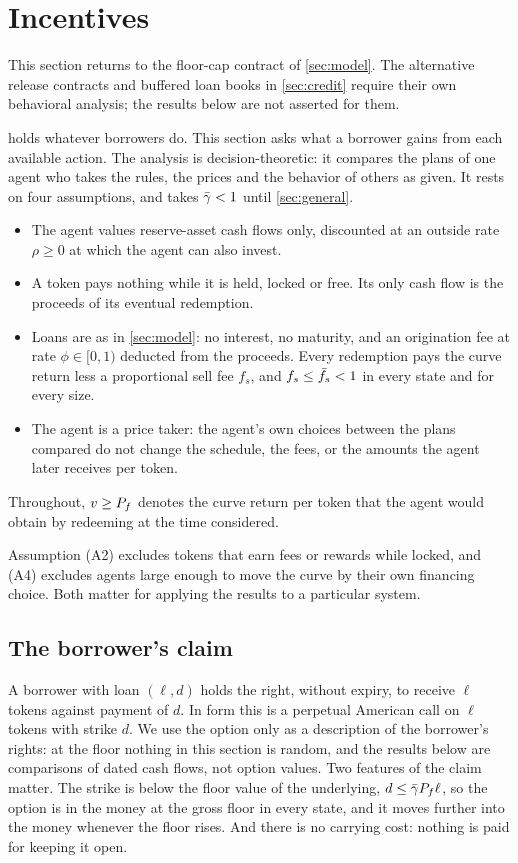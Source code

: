 \section{Incentives}\label{sec:incentives}

This section returns to the floor-cap contract of \cref{sec:model}. The alternative release contracts and buffered loan books in \cref{sec:credit} require their own behavioral analysis; the results below are not asserted for them.

 holds whatever borrowers do. This section asks what a borrower gains from each available action. The analysis is decision-theoretic: it compares the plans of one agent who takes the rules, the prices and the behavior of others as given. It rests on four assumptions, and takes $\bar\gamma<1$ until \cref{sec:general}.

\begin{itemize}
\item[(A1)] The agent values reserve-asset cash flows only, discounted at an outside rate $\rho\ge0$ at which the agent can also invest.
\item[(A2)] A token pays nothing while it is held, locked or free. Its only cash flow is the proceeds of its eventual redemption.
\item[(A3)] Loans are as in \cref{sec:model}: no interest, no maturity, and an origination fee at rate $\phi\in[0,1)$ deducted from the proceeds. Every redemption pays the curve return less a proportional sell fee $f_s$, and $f_s\le\bar f_s<1$ in every state and for every size.
\item[(A4)] The agent is a price taker: the agent's own choices between the plans compared do not change the schedule, the fees, or the amounts the agent later receives per token.
\end{itemize}

Throughout, $v\ge P_f$ denotes the curve return per token that the agent would obtain by redeeming at the time considered.

Assumption (A2) excludes tokens that earn fees or rewards while locked, and (A4) excludes agents large enough to move the curve by their own financing choice. Both matter for applying the results to a particular system.

\subsection{The borrower's claim}

A borrower with loan $(\ell,d)$ holds the right, without expiry, to receive $\ell$ tokens against payment of $d$. In form this is a perpetual American call on $\ell$ tokens with strike $d$. We use the option only as a description of the borrower's rights: at the floor nothing in this section is random, and the results below are comparisons of dated cash flows, not option values. Two features of the claim matter. The strike is below the floor value of the underlying, $d\le\bar\gamma P_f\ell$, so the option is in the money at the gross floor in every state, and it moves further into the money whenever the floor rises. And there is no carrying cost: nothing is paid for keeping it open.

